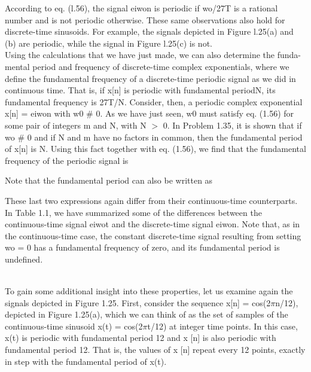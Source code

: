 \documentclass{report}
\begin{document}
According to eq. (l.56), the signal eiwon is periodic if wo/27T is a rational number and is not periodic otherwise. These same observations also
hold for discrete-time sinusoids. For example, the signals depicted in Figure l.25(a) and (b) are periodic, while the signal in Figure l.25(c) is
not.\\
Using the calculations that we have just made, we can also determine the funda- mental period and frequency of discrete-time complex exponentials,
where we define the fundamental frequency of a discrete-time periodic signal as we did in continuous time. That is, if x[n] is periodic with fundamental
periodN, its fundamental frequency is 27T/N. Consider, then, a periodic complex exponential x[n] = eiwon with w0 $\#$ 0. As we have just seen, w0
must satisfy eq. (1.56) for some pair of integers m and N, with N $>$ 0. In Problem 1.35, it is shown that if wo $\#$ 0 and if N and m have no factors
in common, then the fundamental period of x[n] is N. Using this fact together with eq. (1.56), we find that the fundamental frequency of the periodic
signal { }is



Note that the fundamental period can also be written as



These last two expressions again differ from their continuous-time counterparts. In Table 1.1, we have summarized some of the differences between
the continuous-time signal eiwot and the discrete-time signal eiwon. Note that, as in the continuous-time case, the constant discrete-time signal
resulting from setting wo = 0 has a fundamental frequency of zero, and its fundamental period is undefined.



\\
To gain some additional insight into these properties, let us examine again the signals depicted in Figure 1.25. First, consider the sequence x[n]
= cos(2$\pi $n/12), depicted in Figure 1.25(a), which we can think of as the set of samples of the continuous-time sinusoid x(t) = cos(2$\pi $t/12)
at integer time points. In this case, x(t) is periodic with fundamental period 12 and x [n] is also periodic with fundamental period 12. That is,
the values of x [n] repeat every 12 points, exactly in step with the fundamental period of x(t).
\end{document}

